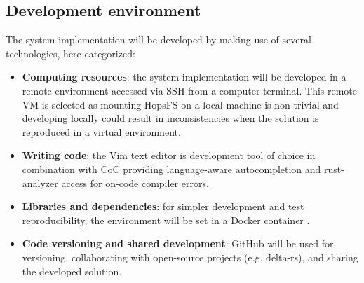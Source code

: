 \subsection{Development environment}
The system implementation will be developed by making use of several technologies, here categorized:
\begin{itemize}
    \item \textbf{Computing resources}: the system implementation will be developed in a remote environment accessed via \gls{SSH} from a computer terminal. This remote \gls{VM} is selected as mounting \gls{HopsFS} on a local machine is non-trivial and developing locally could result in inconsistencies when the solution is reproduced in a virtual environment.
    \item \textbf{Writing code}: the Vim \cite{WelcomeHomeVim} text editor is development tool of choice in combination with \gls{CoC} \cite{NeoclideCocnvim2024} providing language-aware autocompletion and rust-analyzer \cite{fannFannheywardCocrustanalyzer2024} access for on-code compiler errors. 
    \item \textbf{Libraries and dependencies}: for simpler development and test reproducibility, the environment will be set in a Docker container \cite{DockerBuild0200}.
    \item \textbf{Code versioning and shared development}: GitHub \cite{GitHub} will be used for versioning, collaborating with open-source projects (e.g. delta-rs), and sharing the developed solution.
\end{itemize}

 